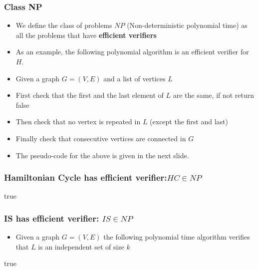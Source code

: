 \documentclass{beamer}
\begin{document}
\begin{frame}
  \frametitle{Class NP}
  \begin{itemize}
  \item We define the class of problems $NP$ (Non-deterministic polynomial time) as all the problems that have \textbf{efficient verifiers}
 \item As an example, the following polynomial algorithm is an efficient verifier for $H$.
 \item Given a graph $G=(V,E)$ and a list of vertices $L$
\item First check that the first and the last element of $L$ are the same, if not return false
\item Then check that no vertex is repeated in $L$ (except the first and last)
\item Finally check that consecutive vertices are connected in $G$
\item The pseudo-code for the above is given in the next slide.
  \end{itemize}
\end{frame}
\begin{frame}
\frametitle{ Hamiltonian Cycle has efficient verifier:$HC\in NP$}
  \begin{function}[H]
 
  \DontPrintSemicolon
  \BlankLine
{}
\Return true\;  
\end{function}

\end{frame}

\begin{frame}
  \frametitle{IS has efficient verifier: $IS\in NP$  }
  \begin{itemize}
      \item Given a graph $G=(V,E)$ the following polynomial time algorithm verifies that
       $L$ is an independent set of size $k$
  \end{itemize}
  \begin{function}[H]
 
  \DontPrintSemicolon
  \BlankLine
{}

\Return true\;  
\end{function}

\end{frame}
\end{document}
